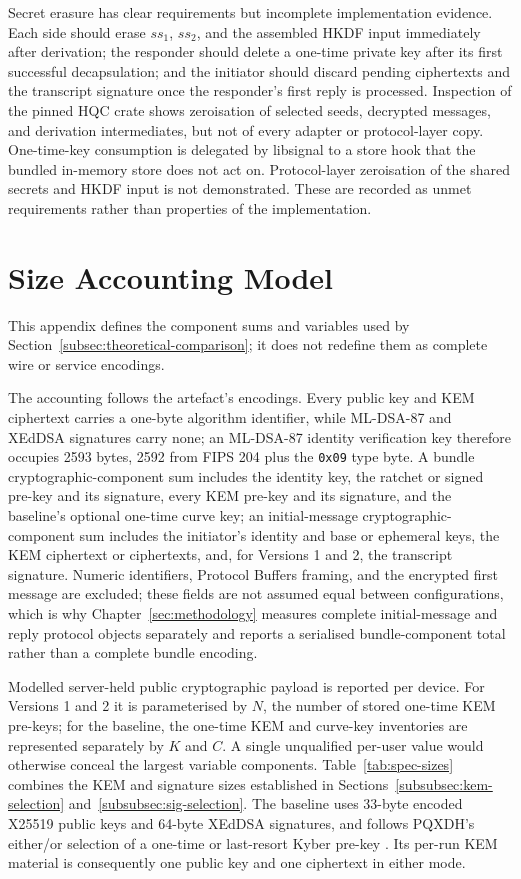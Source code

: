Secret erasure has clear requirements but incomplete implementation evidence. Each side should erase \(ss_1\), \(ss_2\), and the assembled HKDF input immediately after derivation; the responder should delete a one-time private key after its first successful decapsulation; and the initiator should discard pending ciphertexts and the transcript signature once the responder's first reply is processed. Inspection of the pinned HQC crate shows zeroisation of selected seeds, decrypted messages, and derivation intermediates, but not of every adapter or protocol-layer copy. One-time-key consumption is delegated by libsignal to a store hook that the bundled in-memory store does not act on. Protocol-layer zeroisation of the shared secrets and HKDF input is not demonstrated. These are recorded as unmet requirements rather than properties of the implementation.

\section{Size Accounting Model}
\label{app:size-accounting}

This appendix defines the component sums and variables used by Section~\ref{subsec:theoretical-comparison}; it does not redefine them as complete wire or service encodings.

The accounting follows the artefact's encodings. Every public key and KEM ciphertext carries a one-byte algorithm identifier, while ML-DSA-87 and XEdDSA signatures carry none; an ML-DSA-87 identity verification key therefore occupies 2593 bytes, 2592 from FIPS 204 plus the \texttt{0x09} type byte. A bundle cryptographic-component sum includes the identity key, the ratchet or signed pre-key and its signature, every KEM pre-key and its signature, and the baseline's optional one-time curve key; an initial-message cryptographic-component sum includes the initiator's identity and base or ephemeral keys, the KEM ciphertext or ciphertexts, and, for Versions 1 and 2, the transcript signature. Numeric identifiers, Protocol Buffers framing, and the encrypted first message are excluded; these fields are not assumed equal between configurations, which is why Chapter~\ref{sec:methodology} measures complete initial-message and reply protocol objects separately and reports a serialised bundle-component total rather than a complete bundle encoding.

Modelled server-held public cryptographic payload is reported per device. For Versions 1 and 2 it is parameterised by \(N\), the number of stored one-time KEM pre-keys; for the baseline, the one-time KEM and curve-key inventories are represented separately by \(K\) and \(C\). A single unqualified per-user value would otherwise conceal the largest variable components. Table~\ref{tab:spec-sizes} combines the KEM and signature sizes established in Sections~\ref{subsubsec:kem-selection} and~\ref{subsubsec:sig-selection}. The baseline uses 33-byte encoded X25519 public keys and 64-byte XEdDSA signatures, and follows PQXDH's either/or selection of a one-time or last-resort Kyber pre-key \cite{kret_pqxdh_nodate}. Its per-run KEM material is consequently one public key and one ciphertext in either mode.

